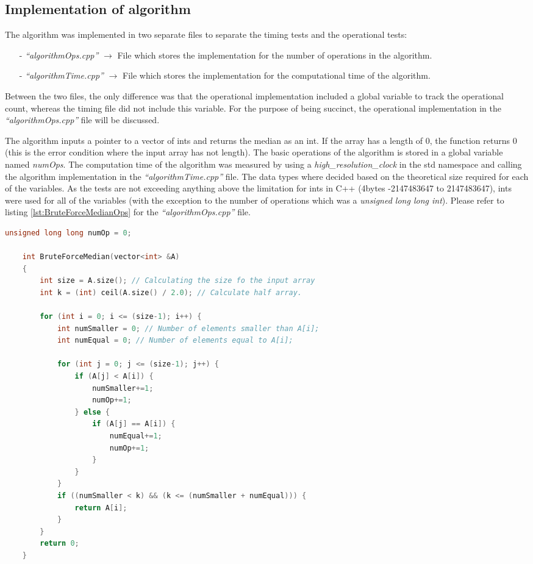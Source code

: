 \documentclass[12pt]{article}
\begin{document}
	\subsection{Implementation of algorithm}
	The algorithm was implemented in two separate files to separate the timing tests and the operational tests:
\begin{itemize}
	\item[-]\textit{“algorithmOps.cpp”} $\rightarrow$ File which stores the implementation for the number of operations in the algorithm.
	\item[-]\textit{“algorithmTime.cpp”} $\rightarrow$ File which stores the implementation for the computational time of the algorithm.
\end{itemize}
	Between the two files, the only difference was that the operational implementation included a global variable to track the operational count, whereas the timing file did not include this variable. For the purpose of being succinct, the operational implementation in the \textit{“algorithmOps.cpp”} file will be discussed. 
	
	The algorithm inputs a pointer to a vector of ints and returns the median as an int. If the array has a length of 0, the function returns 0 (this is the error condition where the input array has not length). The basic operations of the algorithm is stored in a global variable named \textit{numOps}. The computation time of the algorithm was measured by using a \textit{high\_resolution\_clock} in the std namespace and calling the algorithm implementation in the \textit{“algorithmTime.cpp”} file. The data types where decided based on the theoretical size required for each of the variables. As the tests are not exceeding anything above the limitation for ints in C++ (4bytes -2147483647 to 2147483647), ints were used for all of the variables (with the exception to the number of operations which was a \textit{unsigned long long int}). Please refer to listing \ref{lst:BruteForceMedianOps} for the \textit{“algorithmOps.cpp”} file.
	
	\begin{lstlisting}[caption={BruteForceMedian algorithm implementation - \textit{algorithmOps.cpp} (operations implementation)}, label={lst:BruteForceMedianOps}, language=C++]  
	unsigned long long numOp = 0;
	
	int BruteForceMedian(vector<int> &A)
	{
		int size = A.size(); // Calculating the size fo the input array
		int k = (int) ceil(A.size() / 2.0); // Calculate half array.
		
		for (int i = 0; i <= (size-1); i++) {
			int numSmaller = 0; // Number of elements smaller than A[i];
			int numEqual = 0; // Number of elements equal to A[i];
			
			for (int j = 0; j <= (size-1); j++) {
				if (A[j] < A[i]) {
					numSmaller+=1;
					numOp+=1;
				} else {
					if (A[j] == A[i]) {
						numEqual+=1;
						numOp+=1;
					}
				}
			}
			if ((numSmaller < k) && (k <= (numSmaller + numEqual))) {
				return A[i];
			}
		}
		return 0;
	}
	\end{lstlisting}
	
\end{document}
